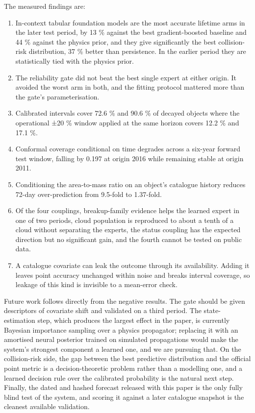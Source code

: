 \documentclass[3p,times]{elsarticle}
\providecommand{\tightlist}{\setlength{\itemsep}{0pt}\setlength{\parskip}{0pt}}
\providecommand{\tightlist}{\setlength{\itemsep}{0pt}\setlength{\parskip}{0pt}}
\begin{document}
The measured findings are:

\begin{enumerate}
\def\labelenumi{\arabic{enumi}.}
\tightlist
\item
  In-context tabular foundation models are the most accurate lifetime
  arms in the later test period, by 13 \% against the best
  gradient-boosted baseline and 44 \% against the physics prior, and
  they give significantly the best collision-risk distribution, 37 \%
  better than persistence. In the earlier period they are statistically
  tied with the physics prior.
\item
  The reliability gate did not beat the best single expert at either
  origin. It avoided the worst arm in both, and the fitting protocol
  mattered more than the gate's parameterisation.
\item
  Calibrated intervals cover 72.6 \% and 90.6 \% of decayed objects
  where the operational ±20 \% window applied at the same horizon covers
  12.2 \% and 17.1 \%.
\item
  Conformal coverage conditional on time degrades across a six-year
  forward test window, falling by 0.197 at origin 2016 while remaining
  stable at origin 2011.
\item
  Conditioning the area-to-mass ratio on an object's catalogue history
  reduces 72-day over-prediction from 9.5-fold to 1.37-fold.
\item
  Of the four couplings, breakup-family evidence helps the learned
  expert in one of two periods, cloud population is reproduced to about
  a tenth of a cloud without separating the experts, the status coupling
  has the expected direction but no significant gain, and the fourth
  cannot be tested on public data.
\item
  A catalogue covariate can leak the outcome through its availability.
  Adding it leaves point accuracy unchanged within noise and breaks
  interval coverage, so leakage of this kind is invisible to a
  mean-error check.
\end{enumerate}

Future work follows directly from the negative results. The gate should
be given descriptors of covariate shift and validated on a third period.
The state-estimation step, which produces the largest effect in the
paper, is currently Bayesian importance sampling over a physics
propagator; replacing it with an amortised neural posterior trained on
simulated propagations would make the system's strongest component a
learned one, and we are pursuing that. On the collision-risk side, the
gap between the best predictive distribution and the official point
metric is a decision-theoretic problem rather than a modelling one, and
a learned decision rule over the calibrated probability is the natural
next step. Finally, the dated and hashed forecast released with this
paper is the only fully blind test of the system, and scoring it against
a later catalogue snapshot is the cleanest available validation.
\end{document}
